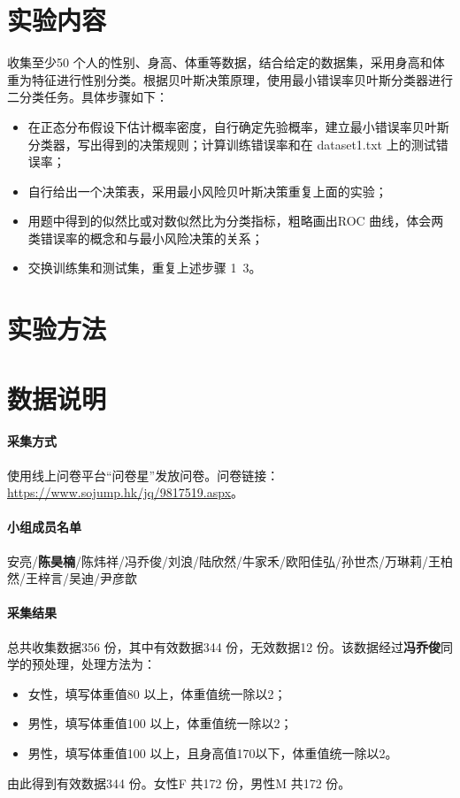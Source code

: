 \tableofcontents
\clearpage


\section{实验内容}
收集至少50 个人的性别、身高、体重等数据，结合给定的数据集，采用身高和体重为特征进行性别分类。根据贝叶斯决策原理，使用最小错误率贝叶斯分类器进行二分类任务。具体步骤如下：

\begin{itemize}
	\item 在正态分布假设下估计概率密度，自行确定先验概率，建立最小错误率贝叶斯分类器，写出得到的决策规则；计算训练错误率和在 dataset1.txt 上的测试错误率；
	\item 自行给出一个决策表，采用最小风险贝叶斯决策重复上面的实验；
	\item 用题中得到的似然比或对数似然比为分类指标，粗略画出ROC 曲线，体会两类错误率的概念和与最小风险决策的关系；
	\item 交换训练集和测试集，重复上述步骤 1~3。
\end{itemize}

\section{实验方法}


\section{数据说明}
	\paragraph{采集方式} 使用线上问卷平台“问卷星”发放问卷。问卷链接：\url{https://www.sojump.hk/jq/9817519.aspx}。
	\paragraph{小组成员名单} 安亮/\textbf{陈昊楠}/陈炜祥/冯乔俊/刘浪/陆欣然/牛家禾/欧阳佳弘/孙世杰/万琳莉/王柏然/王梓言/吴迪/尹彦歆
	\paragraph{采集结果} 总共收集数据356 份，其中有效数据344 份，无效数据12 份。该数据经过\textbf{冯乔俊}同学的预处理，处理方法为：
	\begin{itemize}
		\item 女性，填写体重值80 以上，体重值统一除以2；
		\item 男性，填写体重值100 以上，体重值统一除以2；
		\item 男性，填写体重值100 以上，且身高值170以下，体重值统一除以2。
	\end{itemize}
	由此得到有效数据344 份。女性F 共172 份，男性M 共172 份。

